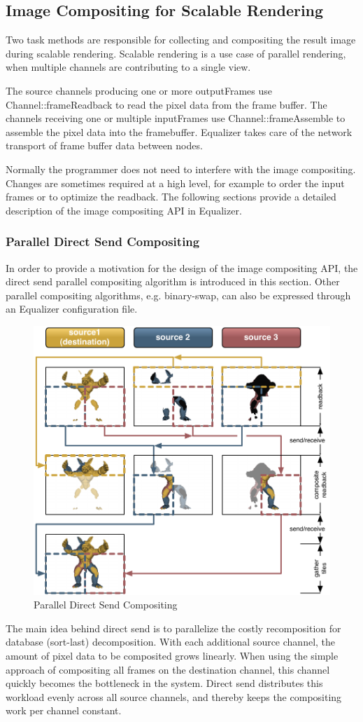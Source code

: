 \documentclass[10pt,a4]{scrartcl}
\begin{document}
\subsection{\label{sCompositing}Image Compositing for Scalable Rendering}

Two task methods are responsible for collecting and compositing the
result image during scalable rendering. Scalable rendering is a use case
of parallel rendering, when multiple channels are contributing to a single
view. 

The source channels producing one or more \textsf{outputFrame}s use
\textsf{Channel::frame\-Read\-back} to read the pixel data from the frame
buffer. The channels receiving one or multiple \textsf{inputFrame}s use
\textsf{Channel::frameAssemb\-le} to assemble the pixel data into the
framebuffer. Equalizer takes care of the network transport of frame
buffer data between nodes.

Normally the programmer does not need to interfere with the image
compositing. Changes are sometimes required at a high level, for example
to order the input frames or to optimize the readback. The following
sections provide a detailed description of the image compositing API in
Equalizer.

\subsubsection{Parallel Direct Send Compositing}

In order to provide a motivation for the design of the image compositing
API, the direct send parallel compositing algorithm is introduced in this
section. Other parallel compositing algorithms, e.g. binary-swap, can
also be expressed through an Equalizer configuration file.

\begin{figure}
  \includegraphics[width=.618\textwidth]{images/directSend.pdf}
  {\caption{\small\label{fDirectSend}Parallel Direct Send Compositing}}
\end{figure}
The main idea behind direct send is to parallelize the costly
recomposition for database (sort-last) decomposition. With each
additional source channel, the amount of pixel data to be composited
grows linearly. When using the simple approach of compositing all frames
on the destination channel, this channel quickly becomes the bottleneck
in the system. Direct send distributes this workload evenly across all
source channels, and thereby keeps the compositing work per channel
constant.
\end{document}
